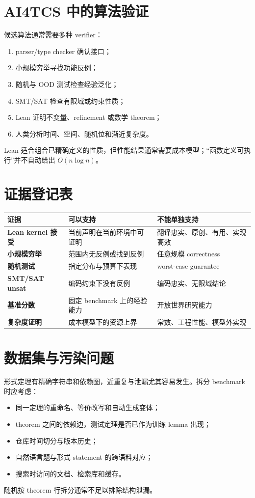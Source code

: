 \section{AI4TCS 中的算法验证}

候选算法通常需要多种 verifier：
\begin{enumerate}
  \item parser/type checker 确认接口；
  \item 小规模穷举寻找功能反例；
  \item 随机与 OOD 测试检查经验泛化；
  \item SMT/SAT 检查有限域或约束性质；
  \item Lean 证明不变量、refinement 或数学 theorem；
  \item 人类分析时间、空间、随机位和渐近复杂度。
\end{enumerate}
Lean 适合组合已精确定义的性质，但性能结果通常需要成本模型；“函数定义可执行”并不自动给出 $O(n\log n)$。

\section{证据登记表}

\begin{center}
\begin{tabularx}{0.96\textwidth}{>{\bfseries}lX X}
\toprule
证据 & 可以支持 & 不能单独支持 \\
\midrule
Lean kernel 接受 & 当前声明在当前环境中可证明 & 翻译忠实、原创、有用、实现高效 \\
小规模穷举 & 范围内无反例或找到反例 & 任意规模 correctness \\
随机测试 & 指定分布与预算下表现 & worst-case guarantee \\
SMT/SAT unsat & 编码约束下没有反例 & 编码忠实、无限域结论 \\
基准分数 & 固定 benchmark 上的经验能力 & 开放世界研究能力 \\
复杂度证明 & 成本模型下的资源上界 & 常数、工程性能、模型外实现 \\
\bottomrule
\end{tabularx}
\end{center}

\section{数据集与污染问题}

形式定理有精确字符串和依赖图，近重复与泄漏尤其容易发生。拆分 benchmark 时应考虑：
\begin{itemize}
  \item 同一定理的重命名、等价改写和自动生成变体；
  \item theorem 之间的依赖边，测试定理是否已作为训练 lemma 出现；
  \item 仓库时间切分与版本历史；
  \item 自然语言题与形式 statement 的跨语料对应；
  \item 搜索时访问的文档、检索库和缓存。
\end{itemize}
随机按 theorem 行拆分通常不足以排除结构泄漏。

